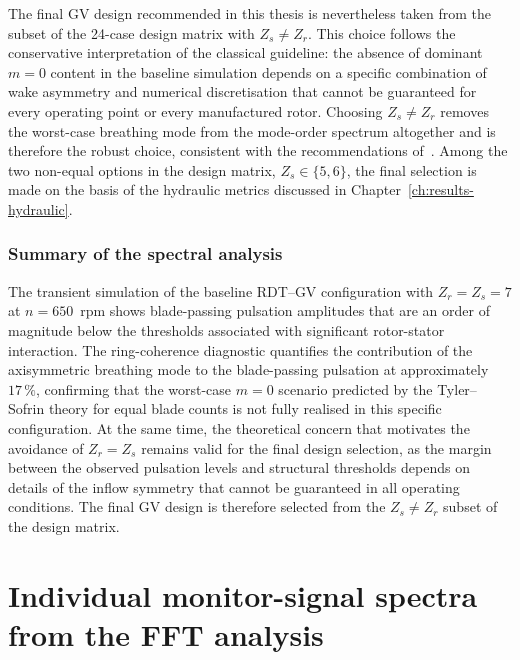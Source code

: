 The final \ac{GV} design recommended in this thesis is nevertheless
taken from the subset of the 24-case design matrix with
$Z_s \neq Z_r$. This choice follows the conservative interpretation
of the classical guideline: the absence of dominant $m=0$ content
in the baseline simulation depends on a specific combination of
wake asymmetry and numerical discretisation that cannot be
guaranteed for every operating point or every manufactured rotor.
Choosing $Z_s \neq Z_r$ removes the worst-case breathing mode from
the mode-order spectrum altogether and is therefore the robust
choice, consistent with the recommendations
of~\cite{brekke,brekke2010,nduwayezu2021}. Among the two non-equal
options in the design matrix, $Z_s \in \{5, 6\}$, the final
selection is made on the basis of the hydraulic metrics discussed
in Chapter~\ref{ch:results-hydraulic}.

\subsection{Summary of the spectral analysis}
\label{sec:results-fft-summary2}

The transient simulation of the baseline \ac{RDT}--\ac{GV}
configuration with $Z_r = Z_s = 7$ at $n = 650$~rpm shows
blade-passing pulsation amplitudes that are an order of magnitude
below the thresholds associated with significant rotor-stator
interaction. The ring-coherence diagnostic quantifies the
contribution of the axisymmetric breathing mode to the
blade-passing pulsation at approximately $17\,\%$, confirming that
the worst-case $m=0$ scenario predicted by the Tyler--Sofrin theory
for equal blade counts is not fully realised in this specific
configuration. At the same time, the theoretical concern that
motivates the avoidance of $Z_r = Z_s$ remains valid for the final
design selection, as the margin between the observed pulsation
levels and structural thresholds depends on details of the inflow
symmetry that cannot be guaranteed in all operating conditions. The
final \ac{GV} design is therefore selected from the
$Z_s \neq Z_r$ subset of the design matrix.



\chapter{Individual monitor-signal spectra from the FFT analysis}
\label{app:individual_spectra}

